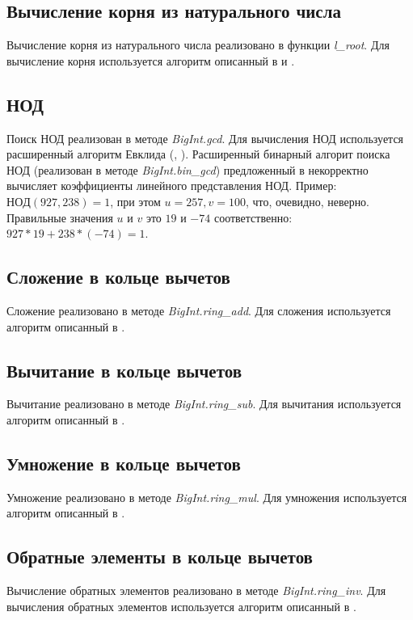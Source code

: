 \subsection{Вычисление корня из натурального числа}
Вычисление корня из натурального числа реализовано в функции \textit{l\_root}. Для вычисление корня используется алгоритм описанный в \cite{zavg} и \cite{nth-root}.

\subsection{НОД}
Поиск НОД реализован в методе \textit{BigInt.gcd}. Для вычисления НОД используется расширенный алгоритм Евклида (\cite{zavg}, \cite{ext-euclid}).
Расширенный бинарный алгорит поиска НОД (реализован в методе \textit{BigInt.bin\_gcd}) предложенный в \cite{zavg} некорректно вычисляет коэффициенты линейного представления НОД.
Пример: $НОД(927, 238) = 1$, при этом $u = 257, v = 100$, что, очевидно, неверно. Правильные значения $u$ и $v$ это $19$ и $-74$ соответственно: $927 * 19 + 238 * (-74) = 1$.

\subsection{Сложение в кольце вычетов}
Сложение реализовано в методе \textit{BigInt.ring\_add}. Для сложения используется алгоритм описанный в \cite{zavg}.

\subsection{Вычитание в кольце вычетов}
Вычитание реализовано в методе \textit{BigInt.ring\_sub}. Для вычитания используется алгоритм описанный в \cite{zavg}.

\subsection{Умножение в кольце вычетов}
Умножение реализовано в методе \textit{BigInt.ring\_mul}. Для умножения используется алгоритм описанный в \cite{zavg}.

\subsection{Обратные элементы в кольце вычетов}
Вычисление обратных элементов реализовано в методе \textit{BigInt.ring\_inv}. Для вычисления обратных элементов используется алгоритм описанный в \cite{zavg}.

